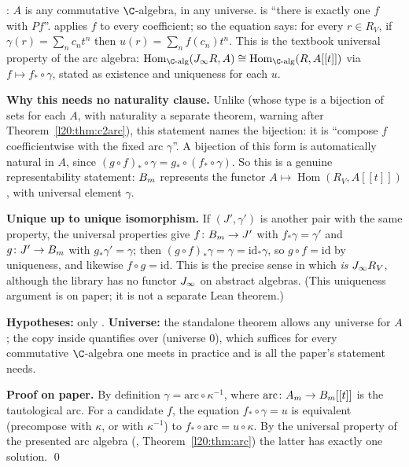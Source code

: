 \begin{dictionary}
: $A$ is any commutative $\C$-algebra, in any universe.  is
``there is exactly one $f$ with $P f$''.  applies $f$ to
every coefficient; so the equation says: for every $r\in R_V$, if $\gamma(r)=\sum_nc_nt^n$ then $u(r)=\sum_nf(c_n)t^n$. This
is the textbook universal property of the arc algebra: $\operatorname{Hom}_{\C\text{-alg}}(\ltwentyJ R,A)\cong
\operatorname{Hom}_{\C\text{-alg}}(R,A[[t]])$ via $f\mapsto f_*\circ\gamma$, stated as existence and uniqueness for each $u$.

\textbf{Why this needs no naturality clause.} Unlike  (whose type is a bijection of sets for each
$A$, with naturality a separate theorem, warning after Theorem~\ref{l20:thm:c2arc}), this statement names the bijection: it is ``compose $f$ coefficientwise with the
fixed arc $\gamma$''. A bijection of this form is automatically natural in $A$, since $(g\circ f)_*\circ\gamma=g_*\circ(f_*\circ\gamma)$.
So this is a genuine representability statement: $B_m$ represents the functor $A\mapsto\operatorname{Hom}(R_V,A[[t]])$,
with universal element $\gamma$.

\textbf{Unique up to unique isomorphism.} If $(J',\gamma')$ is another pair with the same property, the universal properties
give $f\colon B_m\to J'$ with $f_*\gamma=\gamma'$ and $g\colon J'\to B_m$ with $g_*\gamma'=\gamma$; then
$(g\circ f)_*\gamma=\gamma=\mathrm{id}_*\gamma$, so $g\circ f=\mathrm{id}$ by uniqueness, and likewise $f\circ g=\mathrm{id}$. This
is the precise sense in which  \emph{is} $J_\infty R_V$, although the library has no functor
$J_\infty$ on abstract algebras. (This uniqueness argument is on paper; it is not a separate Lean theorem.)

\textbf{Hypotheses:} only . \textbf{Universe:} the standalone theorem allows any universe for $A$; the copy inside
 quantifies over  (universe $0$), which suffices for every commutative
$\C$-algebra one meets in practice and is all the paper's statement needs.
\end{dictionary}

\textbf{Proof on paper.} By definition $\gamma=\mathrm{arc}\circ\kappa^{-1}$, where $\mathrm{arc}\colon A_m\to B_m[[t]]$ is
the tautological arc. For a candidate $f$, the equation $f_*\circ\gamma=u$ is equivalent (precompose with $\kappa$, or with
$\kappa^{-1}$) to $f_*\circ\mathrm{arc}=u\circ\kappa$. By the universal property of the presented arc algebra
(, Theorem~\ref{l20:thm:arc}) the latter has exactly one solution. \qed

